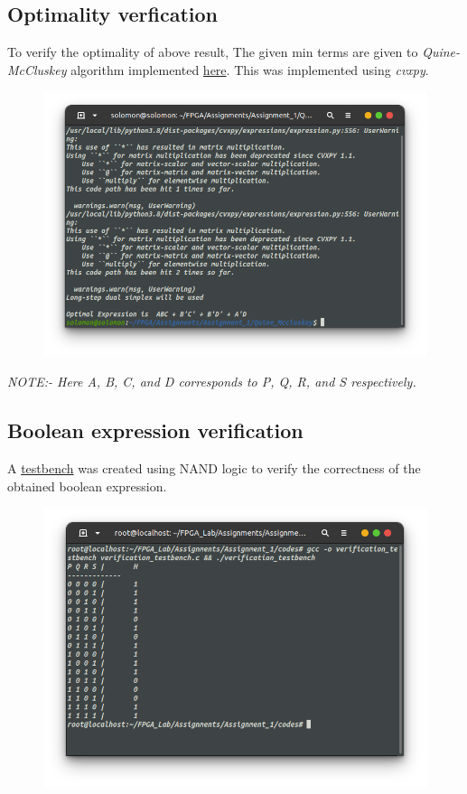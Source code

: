 \documentclass{article}
\begin{document}
\subsection*{Optimality verfication}
To verify the optimality of above result, The given min terms are given to \textit{Quine-McCluskey} algorithm implemented \href{https://github.com/TUdayKiranReddy/FPGA_Lab/tree/main/Assignments/Assignment_1/Quine_Mccluskey}{here}. This was implemented using \textit{cvxpy}.
\begin{figure}[!h]
\includegraphics[scale=0.45]{./figs/opt.png}
\end{figure}

\textit{NOTE:- Here A, B, C, and D corresponds to P, Q, R, and S respectively.}
\newpage
\subsection*{Boolean expression verification}
A \href{https://github.com/TUdayKiranReddy/FPGA_Lab/tree/main/Assignments/Assignment_1/codes/verification_testbench.c}{testbench} was created using NAND logic to verify the correctness of the obtained boolean expression.
\begin{figure}[h!]
\includegraphics[scale=0.45]{./figs/ver.png}
\end{figure}
\end{document}
